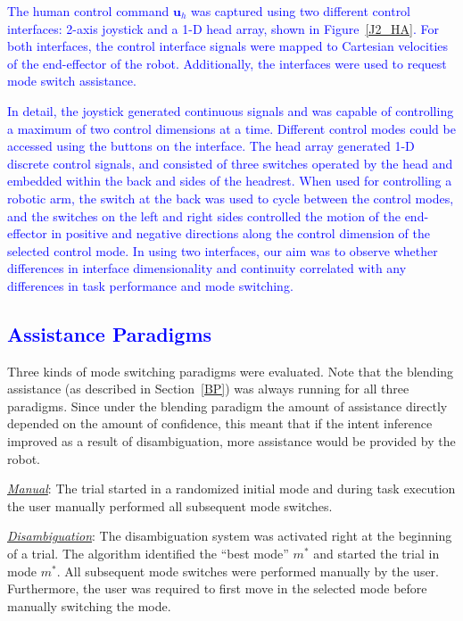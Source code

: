 \documentclass[conference]{IEEEtran}
\begin{document}
 \textcolor{blue}{The human control command $\boldsymbol{u}_h$ was captured using two different control interfaces: 2-axis joystick and a 1-D head array, shown in Figure~\ref{J2_HA}. For both interfaces, the control interface signals were mapped to Cartesian velocities of the end-effector of the robot. Additionally, the interfaces were used to request mode switch assistance.}
 
 \textcolor{blue}{In detail, the joystick generated continuous signals and was capable of controlling a maximum of two control dimensions at a time. Different control modes could be accessed using the buttons on the interface. 
 The head array generated 1-D discrete control signals, and consisted of three switches operated by the head and embedded within the back and sides of the headrest. When used for controlling a robotic arm, the switch at the back was used to cycle between the control modes, and the switches on the left and right sides controlled the motion of the end-effector in positive and negative directions along the control dimension of the selected control mode. In using two interfaces, our aim was to observe whether differences in interface dimensionality and continuity correlated with any differences in task performance and mode switching.}
 
 \subsection{\textcolor{blue}{Assistance Paradigms}}
 Three kinds of mode switching paradigms were evaluated. Note that the blending assistance (as described in Section~\ref{BP}) was always running for all three paradigms. Since under the blending paradigm the amount of assistance directly depended on the amount of confidence, this meant that if the intent inference improved as a result of disambiguation, more assistance would be provided by the robot.
 
 \noindent\underline{\textit{Manual}}: The trial started in a randomized initial mode and during task execution the user manually performed all subsequent mode switches.
 
 \noindent\underline{\textit{Disambiguation}}: The disambiguation system was activated right at the beginning of a trial. The algorithm identified the ``best mode'' $m^*$ and started the trial in mode $m^*$. All subsequent mode switches were performed manually by the user. Furthermore, the user was required to first move in the selected mode before manually switching the mode. 
 
\end{document}
